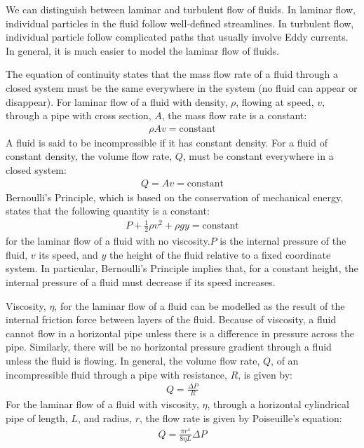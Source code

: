 {{\begin{chapterSummary}
We can distinguish between laminar and turbulent flow of fluids. In laminar flow, individual particles in the fluid follow well-defined streamlines. In turbulent flow, individual particle follow complicated paths that usually involve Eddy currents. In general, it is much easier to model the laminar flow of fluids.

The equation of continuity states that the mass flow rate of a fluid through a closed system must be the same everywhere in the system (no fluid can appear or disappear). For laminar flow of a fluid with density, $\rho$, flowing at speed, $v$, through a pipe with cross section, $A$, the mass flow rate is a constant:
\begin{align*}
\rho A v= \text{constant}
\end{align*}
A fluid is said to be incompressible if it has constant density. For a fluid of constant density, the volume flow rate, $Q$, must be constant everywhere in a closed system:
\begin{align*}
Q = Av = \text{constant}
\end{align*}
Bernoulli's Principle, which is based on the conservation of mechanical energy, states that the following quantity is a constant:
\begin{align*}
P + \frac{1}{2}\rho v^2 + \rho g y= \text{constant}
\end{align*}
for the laminar flow of a fluid with no viscosity.$P$ is the internal pressure of the fluid, $v$ its speed, and $y$ the height of the fluid relative to a fixed coordinate system. In particular, Bernoulli's Principle implies that, for a constant height, the internal pressure of a fluid must decrease if its speed increases.

Viscosity, $\eta$, for the laminar flow of a fluid can be modelled as the result of the internal friction force between layers of the fluid. Because of viscosity, a fluid cannot flow in a horizontal pipe unless there is a difference in pressure across the pipe. Similarly, there will be no horizontal pressure gradient through a fluid unless the fluid is flowing. In general, the volume flow rate, $Q$, of an incompressible fluid through a pipe with resistance, $R$, is given by:
\begin{align*}
Q = \frac{\Delta P}{R} 
\end{align*}
For the laminar flow of a fluid with viscosity, $\eta$, through a horizontal cylindrical pipe of length, $L$, and radius, $r$, the flow rate is given by Poiseuille's equation:
\begin{align*}
Q =  \frac{\pi r^4}{8\eta L}\Delta P
\end{align*}


\end{chapterSummary}}}
